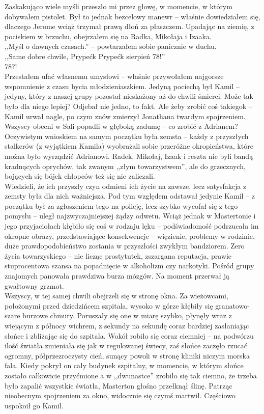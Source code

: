 \documentclass[../MAIN.tex]{subfiles}
\begin{document}
Zaskakująco wiele myśli przeszło mi przez głowę, w momencie, w którym dobywałem pistolet. Był to jednak bezcelowy manewr -- właśnie dowiedziałem się, dlaczego Jerome wciąż trzymał prawą dłoń za płaszczem. Upadając na ziemię, z pociskiem w brzuchu, obejrzałem się na Radka, Mikołaja i Izaaka.\\
,,Myśl o dawnych czasach.'' -- powtarzałem sobie panicznie w duchu.\\
,,Same dobre chwile, Prypeć\3k Prypeć\3k sierpień 78!''\\
78?!\\
Przestałem ufać własnemu umysłowi -- właśnie przywołałem najgorsze wspomnienie z czasu bycia młodzieniaszkiem. Jedyną pociechą był Kamil -- jedyny, który z naszej grupy pozostał nieskażony aż do chwili śmierci. Może tak było dla niego lepiej?
% 
% 
\sx Odjebał nie jedno, to fakt. Ale żeby zrobić coś takiego\3k -- Kamil urwał nagle, po czym znów zmierzył Jonathana twardym spojrzeniem.
\qd
Wszyscy obecni w Sali popadli w głęboką zadumę -- co zrobić z Adrianem? \\
Oczywistym wnioskiem na samym początku była zemsta -- każdy z przyszłych stalkerów (z wyjątkiem Kamila) wyobrażali sobie przeróżne okropieństwa, które można było wyrządzić Adrianowi. Radek, Mikołaj, Izaak i reszta nie byli bandą kradnących oprychów, tak zwanym ,,złym towarzystwem'', ale do grzecznych, bojących się bójek chłopców też się nie zaliczali.\\
Wiedzieli, że ich przyszły czyn odmieni ich życie na zawsze, lecz satysfakcja z zemsty była dla nich ważniejsza. Pod tym względem odstawał jedynie Kamil -- z początku był za zgłoszeniem tego na policję, lecz szybko wycofał się z tego pomysłu -- uległ najzwyczajniejszej żądzy odwetu. Wciąż jednak w Mastertonie i jego przyjaciołach kłębiło się coś w rodzaju lęku -- podświadomość podrzucała im okropne obrazy, przedstawiające konsekwencje -- więzienie, problemy w rodzinie, duże prawdopodobieństwo zostania w przyszłości zwykłym bandziorem. Zero życia towarzyskiego -- nie licząc prostytutek, zszargana reputacja, prawie stuprocentowa szansa na popadnięcie w alkoholizm czy narkotyki. Pośród grupy znajomych panowała prawdziwa burza mózgów. Na moment przerwał ją gwałtowny grzmot.\\
Wszyscy, w tej samej chwili obejrzeli się w stronę okna. Za wieżowcami, położonymi przed dziedzińcem szpitala, wysoko w górze kłębiły się granatowo-szare burzowe chmury. Poruszały się one w miarę szybko, płynęły wraz z wiejącym z północy wichrem, z sekundy na sekundę coraz bardziej zasłaniając słońce i zbliżając się do szpitala. Wokół robiło się coraz ciemniej -- na podwórzu ilość światła zmieniała się jak w regulowanej świecy, zaś słońce zaczęło rzucać ogromny, półprzezroczysty cień, sunący powoli w stronę kliniki niczym morska fala. Kiedy pokrył on cały budynek szpitalny, w momencie, w którym słońce zostało całkowicie przyćmione a w ,,dwunastce'' zrobiło się tak ciemno, że trzeba było zapalić wszystkie światła, Masterton głośno przełknął ślinę. Patrząc nieobecnym spojrzeniem za okno, widocznie się czymś martwił. Częściowo uspokoił go Kamil.
\end{document}

